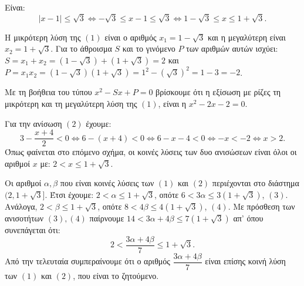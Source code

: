 
\begin{alist}
\item Είναι:
\[|x - 1| \le \sqrt{3} \Leftrightarrow -\sqrt{3} \le x - 1 \le \sqrt{3} \Leftrightarrow 1 - \sqrt{3} \le x \le 1 + \sqrt{3}.\]

\item Η μικρότερη λύση της $(1)$ είναι ο αριθμός $x_1 = 1 - \sqrt{3}$ και η μεγαλύτερη είναι $x_2 = 1 + \sqrt{3}$.
Για το άθροισμα $S$ και το γινόμενο $P$ των αριθμών αυτών ισχύει:
$S = x_1 + x_2 = (1 - \sqrt{3}) + (1 + \sqrt{3}) = 2$ και $P = x_1x_2 = (1 - \sqrt{3})(1 + \sqrt{3}) = 1^2 - (\sqrt{3})^2 = 1 - 3 = -2$.

Με τη βοήθεια του τύπου $x^2 - Sx + P = 0$ βρίσκουμε ότι η εξίσωση με ρίζες τη μικρότερη και
τη μεγαλύτερη λύση της $(1)$, είναι η $x^2 - 2x - 2 = 0$.

\item Για την ανίσωση $(2)$ έχουμε:
\[3 - \dfrac{x+4}{2} < 0 \Leftrightarrow 6 - (x + 4) < 0 \Leftrightarrow 6 - x - 4 < 0 \Leftrightarrow -x < -2 \Leftrightarrow x > 2.\]
Όπως φαίνεται στο επόμενο σχήμα, οι κοινές λύσεις των δυο ανισώσεων είναι όλοι οι αριθμοί $x$ με: $2 < x \le 1 + \sqrt{3}$.

\item Οι αριθμοί $\alpha, \beta$ που είναι κοινές λύσεις των $(1)$ και $(2)$ περιέχονται στο διάστημα $(2, 1 + \sqrt{3}]$.
Έτσι έχουμε: $2 < \alpha \le 1 + \sqrt{3}$, οπότε $6 < 3\alpha \le 3(1 + \sqrt{3})$, $(3)$.
Ανάλογα, $2 < \beta \le 1 + \sqrt{3}$, οπότε $8 < 4\beta \le 4(1 + \sqrt{3})$, $(4)$.
Με πρόσθεση των ανισοτήτων $(3), (4)$ παίρνουμε $14 < 3\alpha + 4\beta \le 7(1 + \sqrt{3})$ απ' όπου
συνεπάγεται ότι:
\[2 < \dfrac{3\alpha + 4\beta}{7} \le 1 + \sqrt{3}.\]
Από την τελευταία συμπεραίνουμε ότι ο αριθμός $\dfrac{3\alpha + 4\beta}{7}$ είναι επίσης κοινή λύση των $(1)$
και $(2)$, που είναι το ζητούμενο.
\end{alist}

